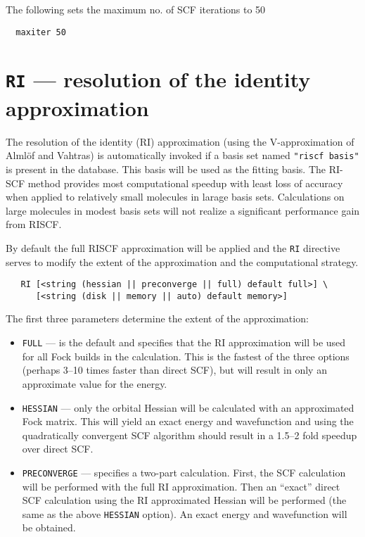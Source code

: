 The following sets the maximum no. of SCF iterations to 50
\begin{verbatim}
  maxiter 50
\end{verbatim}

\section{{\tt RI} --- resolution of the identity approximation}
\label{sec:riscf}

The resolution of the identity (RI) approximation (using the
V-approximation of Alml\"{o}f and Vahtras) is automatically invoked if
a basis set named \verb+"riscf basis"+ is present in the database.
This basis will be used as the fitting basis.  The RI-SCF method
provides most computational speedup with least loss of accuracy when
applied to relatively small molecules in larage basis sets.
Calculations on large molecules in modest basis sets will not realize
a significant performance gain from RISCF.

By default the full RISCF approximation will be applied and the
\verb+RI+ directive serves to modify the extent of the approximation
and the computational strategy.

\begin{verbatim}
   RI [<string (hessian || preconverge || full) default full>] \
      [<string (disk || memory || auto) default memory>]
\end{verbatim}

The first three parameters determine the extent of the approximation:
\begin{itemize} 
\item \verb+FULL+ --- is the default and specifies that the RI
  approximation will be used for all Fock builds in the calculation.
  This is the fastest of the three options (perhaps 3--10 times faster
  than direct SCF), but will result in only an approximate value for
  the energy.

\item \verb+HESSIAN+ --- only the orbital Hessian will be calculated
  with an approximated Fock matrix.  This will yield an exact energy
  and wavefunction and using the quadratically convergent SCF
  algorithm should result in a 1.5--2 fold speedup over direct SCF.

\item \verb+PRECONVERGE+ --- specifies a two-part calculation.  First,
  the SCF calculation will be performed with the full RI
  approximation.  Then an ``exact'' direct SCF calculation using the
  RI approximated Hessian will be performed (the same as the above
  \verb+HESSIAN+ option).  An exact energy and wavefunction will be
  obtained.
\end{itemize}

